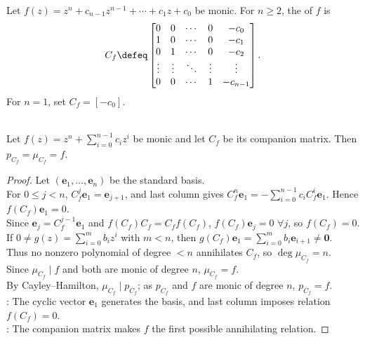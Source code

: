 \begin{definition} \label{def:companion-matrix} \\
Let $f(z)=z^n+c_{n-1}z^{n-1}+\cdots+c_1z+c_0$ be monic. For $n\geq2$, the  of $f$ is
\begin{align}
C_f\defeq
\begin{bmatrix}
0&0&\cdots&0&-c_0\\
1&0&\cdots&0&-c_1\\
0&1&\cdots&0&-c_2\\
\vdots&\vdots&\ddots&\vdots&\vdots\\
0&0&\cdots&1&-c_{n-1}
\end{bmatrix}.
\nonumber
\end{align}
For $n=1$, set $C_f=[-c_0]$.
\end{definition}

\begin{theorem} \label{thm:companion-matrix-has-prescribed-minimal-polynomial} \\
Let $f(z)=z^n+\sum_{i=0}^{n-1}c_iz^i$ be monic and let $C_f$ be its companion matrix. Then $p_{C_f}=\mu_{C_f}=f$.
\begin{proof}
Let $(\mathbf{e}_1,\ldots,\mathbf{e}_n)$ be the standard basis.\\
For $0\leq j<n$, $C_f^j\mathbf{e}_1=\mathbf{e}_{j+1}$, and last column gives $C_f^n\mathbf{e}_1=-\sum\limits_{i=0}^{n-1}c_iC_f^i\mathbf{e}_1$. Hence $f(C_f)\mathbf{e}_1=0$.\\
Since $\mathbf{e}_j=C_f^{j-1}\mathbf{e}_1$ and $f(C_f)C_f=C_ff(C_f)$, $f(C_f)\mathbf{e}_j=0$ $\forall j$, so $f(C_f)=0$.\\
If $0\neq g(z)=\sum\limits_{i=0}^m b_iz^i$ with $m<n$, then $g(C_f)\mathbf{e}_1=\sum\limits_{i=0}^m b_i\mathbf{e}_{i+1}\neq\mathbf{0}$.\\
Thus no nonzero polynomial of degree $<n$ annihilates $C_f$, so $\deg\mu_{C_f}=n$.\\
Since $\mu_{C_f}\mid f$ and both are monic of degree $n$, $\mu_{C_f}=f$.\\
By Cayley--Hamilton, $\mu_{C_f}\mid p_{C_f}$; as $p_{C_f}$ and $f$ are monic of degree $n$, $p_{C_f}=f$.\\
: The cyclic vector $\mathbf{e}_1$ generates the basis, and last column imposes relation $f(C_f)=0$.\\
: The companion matrix makes $f$ the first possible annihilating relation.
\end{proof}
\end{theorem}

